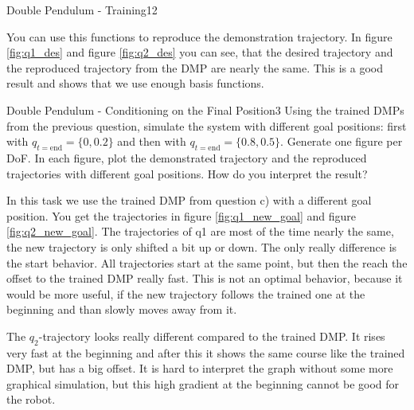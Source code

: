 \begin{questions}
\begin{question}{Double Pendulum - Training}{12}
\begin{answer}
You can use this functions to reproduce the demonstration trajectory. In figure \ref{fig:q1_des} and figure \ref{fig:q2_des} you can see, that the desired trajectory and the reproduced trajectory from the DMP are nearly the same. This is a good result and shows that we use enough basis functions.

\end{answer}

\end{question}


\begin{question}{Double Pendulum - Conditioning on the Final Position}{3}
Using the trained DMPs from the previous question, simulate the system with different goal positions: first with $q_{t=\mathrm{end}} = \{0, 0.2\}$ and then with $q_{t=\mathrm{end}} = \{0.8, 0.5\}$. Generate one figure per DoF. In each figure, plot the demonstrated trajectory and the reproduced trajectories with different goal positions.
How do you interpret the result? 

\begin{answer}
In this task we use the trained DMP from question c) with a different goal position. You get the trajectories in figure \ref{fig:q1_new_goal} and figure \ref{fig:q2_new_goal}. The trajectories of q1 are most of the time nearly the same, the new trajectory is only shifted a bit up or down. The only really difference is the start behavior. All trajectories start at the same point, but then the reach the offset to the trained DMP really fast. This is not an optimal behavior, because it would be more useful, if the new trajectory follows the trained one at the beginning and than slowly moves away from it.

The $q_2$-trajectory looks really different compared to the trained DMP. It rises very fast at the beginning and after this it shows the same course like the trained DMP, but has a big offset. It is hard to interpret the graph without some more graphical simulation, but this high gradient at the beginning cannot be good for the robot.


\end{answer}
\end{question}
\end{questions}
